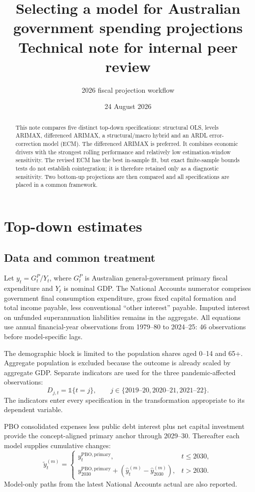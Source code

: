 \documentclass[11pt,a4paper]{article}
\title{Selecting a model for Australian government spending projections\\
\large Technical note for internal peer review}
\author{2026 fiscal projection workflow}
\date{24 August 2026}
\newcommand{\ind}{\mathbb{1}}
\begin{document}
\maketitle

\begin{abstract}
This note compares five distinct top-down specifications: structural OLS, levels ARIMAX, differenced ARIMAX, a structural/macro hybrid and an ARDL error-correction model (ECM). The differenced ARIMAX is preferred. It combines economic drivers with the strongest rolling performance and relatively low estimation-window sensitivity. The revised ECM has the best in-sample fit, but exact finite-sample bounds tests do not establish cointegration; it is therefore retained only as a diagnostic sensitivity. Two bottom-up projections are then compared and all specifications are placed in a common framework.
\end{abstract}

\section{Top-down estimates}

\subsection{Data and common treatment}

Let $y_t=G_t^P/Y_t$, where $G_t^P$ is Australian general-government primary fiscal expenditure and $Y_t$ is nominal GDP. The National Accounts numerator comprises government final consumption expenditure, gross fixed capital formation and total income payable, less conventional ``other interest'' payable. Imputed interest on unfunded superannuation liabilities remains in the aggregate. All equations use annual financial-year observations from 1979--80 to 2024--25: 46 observations before model-specific lags.

The demographic block is limited to the population shares aged 0--14 and 65+. Aggregate population is excluded because the outcome is already scaled by aggregate GDP. Separate indicators are used for the three pandemic-affected observations:
\[
D_{j,t}=\ind\{t=j\},\qquad j\in\{2019\text{--}20,2020\text{--}21,2021\text{--}22\}.
\]
The indicators enter every specification in the transformation appropriate to its dependent variable.

PBO consolidated expenses less public debt interest plus net capital investment provide the concept-aligned primary anchor through 2029--30. Thereafter each model supplies cumulative changes:
\[
\widetilde y^{(m)}_t=
\begin{cases}
y_t^{\mathrm{PBO,primary}},&t\leq2030,\\
y_{2030}^{\mathrm{PBO,primary}}+(\widehat y_t^{(m)}-\widehat y_{2030}^{(m)}),&t>2030.
\end{cases}
\]
Model-only paths from the latest National Accounts actual are also reported.
\end{document}

